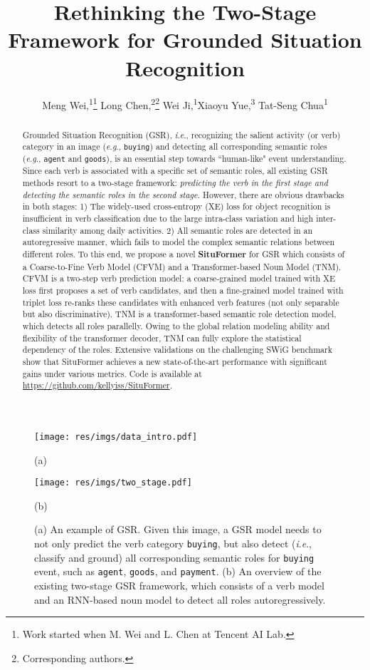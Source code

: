\documentclass[letterpaper]{article} \usepackage{aaai22}  \usepackage{times}  \usepackage{helvet}  \usepackage{courier}  \usepackage[hyphens]{url}  \usepackage{graphicx} \urlstyle{rm} \def\UrlFont{\rm}  \usepackage{natbib}  \usepackage{caption} \DeclareCaptionStyle{ruled}{labelfont=normalfont,labelsep=colon,strut=off} \frenchspacing  \setlength{\pdfpagewidth}{8.5in}  \setlength{\pdfpageheight}{11in}
\title{Rethinking the Two-Stage Framework for Grounded Situation Recognition}
\author {
    Meng Wei,\textsuperscript{\rm 1}\thanks{Work started when M. Wei and L. Chen at Tencent AI Lab.}
    Long Chen,\textsuperscript{\rm 2}\footnotemark[1]\thanks{Corresponding authors.}
    Wei Ji,\textsuperscript{\rm 1}\footnotemark[2]
    Xiaoyu Yue,\textsuperscript{\rm 3}
    Tat-Seng Chua\textsuperscript{\rm 1}\\
}
\newcommand{\ie}{\textit{i}.\textit{e}.}
\newcommand{\eg}{\textit{e}.\textit{g}.}
\begin{document}
\maketitle


\begin{abstract}
Grounded Situation Recognition (GSR), \ie, recognizing the salient activity (or verb) category in an image (\eg, \texttt{buying}) and detecting all corresponding semantic roles (\eg, \texttt{agent} and \texttt{goods}), is an essential step towards ``human-like" event understanding. Since each verb is associated with a specific set of semantic roles, all existing GSR methods resort to a two-stage framework: \emph{predicting the verb in the first stage and detecting the semantic roles in the second stage.} However, there are obvious drawbacks in both stages: 1) The widely-used cross-entropy (XE) loss for object recognition is insufficient in verb classification due to the large intra-class variation and high inter-class similarity among daily activities. 2) All semantic roles are detected in an autoregressive manner, which fails to model the complex semantic relations between different roles. To this end, we propose a novel \textbf{SituFormer} for GSR which consists of a Coarse-to-Fine Verb Model (CFVM) and a Transformer-based Noun Model (TNM). CFVM is a two-step verb prediction model: a coarse-grained model trained with XE loss first proposes a set of verb candidates, and then a fine-grained model trained with triplet loss re-ranks these candidates with enhanced verb features (not only separable but also discriminative).
TNM is a transformer-based semantic role detection model, which detects all roles parallelly.
Owing to the global relation modeling ability and flexibility of the transformer decoder, TNM can fully explore the statistical dependency of the roles.
Extensive validations on the challenging SWiG benchmark show that SituFormer achieves a new state-of-the-art performance with significant gains under various metrics.
Code is available at \url{https://github.com/kellyiss/SituFormer}.








\end{abstract}

\begin{figure}[t]
	\centering
	\texttt{[image: res/imgs/data\_intro.pdf]}
	
	(a)
	
	\texttt{[image: res/imgs/two\_stage.pdf]}
	
	(b)
	\caption{(a) An example of GSR. Given this image, a GSR model needs to not only predict the verb category \texttt{buying}, but also detect (\ie, classify and ground) all corresponding semantic roles for \texttt{buying} event, such as \texttt{agent}, \texttt{goods}, and \texttt{payment}. (b) An overview of the existing two-stage GSR framework, which consists of a verb model and an RNN-based noun model to detect all roles autoregressively.
	}
	\label{fig:motivation}
\end{figure}
\end{document}
